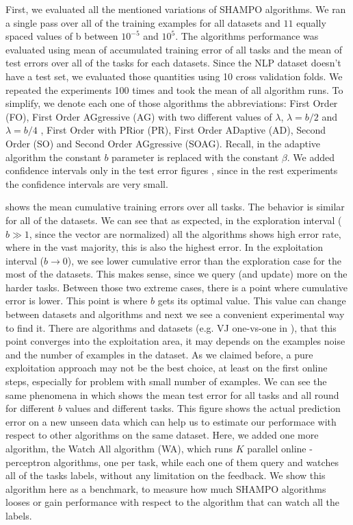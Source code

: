 First, we evaluated all the mentioned variations of SHAMPO algorithms. We ran a 
single pass over all of the training examples for all datasets and $11$ equally spaced values of b 
between $10^{-5}$ and $10^5$. The algorithms performance was evaluated using 
mean of accumulated training error of all tasks and the mean of test errors over 
all of the tasks for each datasets. Since the NLP dataset doesn't have a test 
set, we evaluated those quantities using 10 cross validation folds. We repeated 
the experiments 100 times and took the mean of all algorithm runs.
To simplify, we denote each one of those algorithms the  
abbreviations: First Order (FO), First Order AGgressive (AG) with two different values of $\lambda$, 
$\lambda = b/2$ and $\lambda = b/4$ , First Order with PRior (PR), First Order 
ADaptive (AD), Second Order (SO) and Second Order AGgressive (SOAG). 
Recall, in the adaptive algorithm the constant $b$ parameter is replaced with the constant 
$\beta$. We added confidence intervals only in the test error figures
, since in the rest experiments the confidence intervals are very small.

 shows the mean cumulative training errors over all tasks. The behavior is similar for 
all of the datasets. We can see that as expected, in the exploration interval ($b \gg 1$, since the vector are normalized) 
all the algorithms shows high error rate, where in the vast majority, this is 
also the highest error. In the exploitation interval ($b\rightarrow 0$), we  see 
lower cumulative error than the exploration case for the most of the datasets. 
This makes sense, since we query (and update) more on the harder tasks.
Between those two extreme cases, there is a point where cumulative error is 
lower. This point is where $b$ gets its optimal value. This value can change 
between datasets and algorithms and next we see a convenient experimental way to find it. 
There are algorithms and datasets (e.g. VJ one-vs-one in ), that this point converges
into the exploitation area, it may depends on the examples noise and the number of examples 
in the dataset. As we claimed before, a pure exploitation approach may not be the best choice, at least on 
the first online steps, especially for problem with small number of examples.
We can see the same phenomena in  which shows the mean 
test error for all tasks and all round for different $b$ values and different 
tasks. This figure shows the actual prediction error on a new unseen data which can help us to estimate our 
performace with respect to other algorithms on the same dataset. Here, we added one more algorithm, the Watch All algorithm (WA), which runs $K$ parallel online - 
perceptron algorithms, one per task, while each one of them query and watches all of the tasks labels, without any limitation on the feedback.
We show this algorithm here as a benchmark, to measure how much SHAMPO algorithms looses or gain 
performance with respect to the algorithm that can watch all the labels. 




